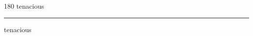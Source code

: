 
\begin{frame}
\begin{center}
\begin{turn}{180}
{\fontsize{2.5cm}{1em}\selectfont tenacious}
\end{turn}
\vspace{1em}\par  
\hrule
\vspace{1em}\par  
{\fontsize{2.5cm}{1em}\selectfont tenacious}
\end{center}
\end{frame}
